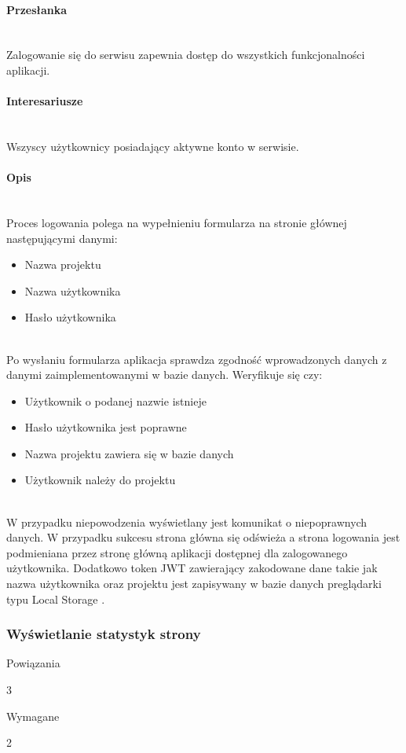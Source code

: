 \documentclass[eng,printmode]{mgr}
\begin{document}
\paragraph{Przesłanka}\ \\
Zalogowanie się do serwisu zapewnia dostęp do wszystkich funkcjonalności aplikacji.

\paragraph{Interesariusze}\ \\
Wszyscy użytkownicy posiadający aktywne konto w serwisie.

\paragraph{Opis}\ \\
Proces logowania polega na wypełnieniu formularza na stronie głównej następującymi danymi:
\begin{itemize}
	\item Nazwa projektu
	\item Nazwa użytkownika
	\item Hasło użytkownika
\end{itemize}
\ \\
Po wysłaniu formularza aplikacja sprawdza zgodność wprowadzonych danych z danymi zaimplementowanymi w bazie danych. Weryfikuje się czy:
\begin{itemize}
	\item Użytkownik o podanej nazwie istnieje
	\item Hasło użytkownika jest poprawne
	\item Nazwa projektu zawiera się w bazie danych
	\item Użytkownik należy do projektu
\end{itemize}
\ \\
W przypadku niepowodzenia wyświetlany jest komunikat o niepoprawnych danych. W przypadku sukcesu strona główna się odświeża a strona logowania jest podmieniana przez stronę główną aplikacji dostępnej dla zalogowanego użytkownika. Dodatkowo token JWT zawierający zakodowane dane takie jak nazwa użytkownika oraz projektu jest zapisywany w bazie danych preglądarki typu Local Storage \cite {local_storage}.
\newpage

\subsubsection{Wyświetlanie statystyk strony}
\begin{labeling}{Powiązania}
\item [ID:] 3
\item [Typ:] Wymagane
\item [Powiązania] 2
\end{labeling}
\end{document}
